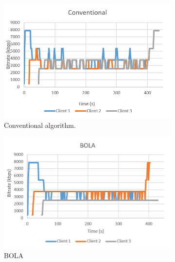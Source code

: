 \documentclass[journal]{IEEEtran}
\begin{document}
\begin{figure}[!h]
	\centering
	
    \begin{subfigure}[t]{0.3\textwidth}
         \centering
         \includegraphics[width=\textwidth]{images/Rate_Conventional.png}
         \caption{Conventional algorithm.}
         \label{Rate Conv}
     \end{subfigure}
     \begin{subfigure}[t]{0.3\textwidth}
         \centering
         \includegraphics[width=\textwidth]{images/Rate_BOLA.png}
         \caption{BOLA}
         \label{Rate BOLA}
     \end{subfigure}
     \\
	\begin{subfigure}[t]{0.3\textwidth}
         \centering

\end{subfigure}
\end{figure}
\end{document}
